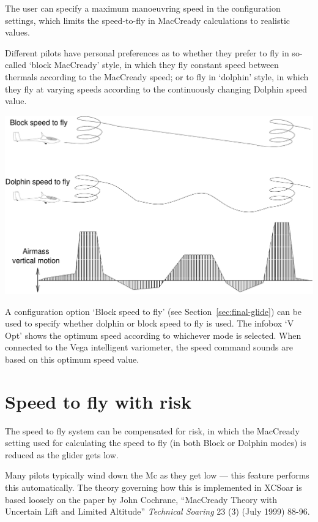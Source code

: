 \documentclass[a4paper,12pt]{refrep}
\begin{document}
The user can specify a maximum manoeuvring speed in the configuration
settings, which limits the speed-to-fly in MacCready calculations to
realistic values.

Different pilots have personal preferences as to whether they prefer
to fly in so-called `block MacCready' style, in which they fly
constant speed between thermals according to the MacCready speed; or
to fly in `dolphin' style, in which they fly at varying speeds
according to the continuously changing Dolphin speed value.

\begin{maxipage}
\begin{center}
\includegraphics[angle=0,width=0.8\linewidth,keepaspectratio='true']{figures/blockmc.pdf}
\end{center}
\end{maxipage}

A configuration option `Block speed to fly' (see
Section~\ref{sec:final-glide}) can be used to specify whether dolphin
or block speed to fly is used.  The infobox `V Opt' shows the optimum
speed according to whichever mode is selected.  When connected to the
Vega intelligent variometer, the speed command sounds are based on
this optimum speed value.

\section{Speed to fly with risk}\label{sec:speed-fly-with}
  The speed to fly system can be compensated for risk, in which the
  MacCready setting used for calculating the speed to fly (in both
  Block or Dolphin modes) is reduced as the glider gets low.

  Many pilots typically wind down the Mc as they get low --- this
  feature performs this automatically.  The theory governing how this
  is implemented in XCSoar is based loosely on the paper by John
  Cochrane, ``MacCready Theory with Uncertain Lift and Limited
  Altitude'' {\em Technical Soaring} 23 (3) (July 1999) 88-96.
\end{document}
